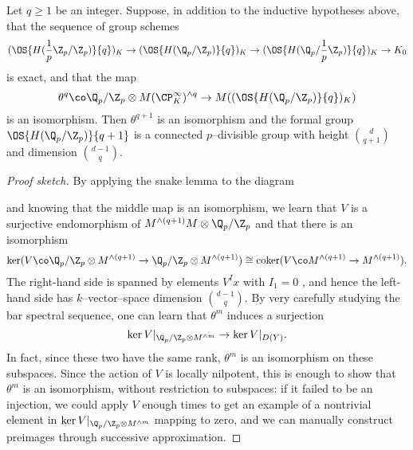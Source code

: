 \begin{theorem}

Let $q \ge 1$ be an integer.  Suppose, in addition to the inductive hypotheses above, that the sequence of group schemes \[(\OS{H(\frac{1}{p}\Z_p / \Z_p)}{q})_K \to (\OS{H(\Q_p/\Z_p)}{q})_K \to (\OS{H(\Q_p / \frac{1}{p}\Z_p)}{q})_K \to K_0\] is exact, and that the map \[\theta^q\co \Q_p / \Z_p \otimes M(\CP^\infty_K)^{\wedge q} \to M((\OS{H(\Q_p/\Z_p)}{q})_K)\] is an isomorphism.  Then $\theta^{q+1}$ is an isomorphism and the formal group $\OS{H(\Q_p/\Z_p)}{q+1}$ is a connected $p$--divisible group with height $\binom{d}{q+1}$ and dimension $\binom{d-1}{q}$.
\end{theorem}
\begin{proof}[Proof sketch]
By applying the snake lemma to the diagram
\begin{center}
\end{center} 
and knowing that the middle map is an isomorphism, we learn that $V$ is a surjective endomorphism of $M^{\wedge (q+1)} M \otimes \Q_p/\Z_p$ and that there is an isomorphism \[\ker(V\co \Q_p/\Z_p \otimes M^{\wedge (q+1)} \to \Q_p/\Z_p \otimes M^{\wedge (q+1)}) \cong \operatorname{coker}(V\co M^{\wedge (q+1)} \to M^{\wedge (q+1)}).\]  The right-hand side is spanned by elements $V^I x$ with $I_1 = 0$ , and hence the left-hand side has $k$--vector--space dimension $\binom{d-1}{q}$.  By very carefully studying the bar spectral sequence, one can learn that $\theta^m$ induces a surjection \[\ker V|_{\Q_p / \Z_p \otimes M^{\wedge m}} \to \ker V|_{D(Y)}.\]  In fact, since these two have the same rank, $\theta^m$ is an isomorphism on these subspaces.  Since the action of $V$ is locally nilpotent, this is enough to show that $\theta^m$ is an isomorphism, without restriction to subspaces: if it failed to be an injection, we could apply $V$ enough times to get an example of a nontrivial element in $\ker V|_{\Q_p / \Z_p \otimes M^{\wedge m}}$ mapping to zero, and we can manually construct preimages through successive approximation.
\end{proof}

